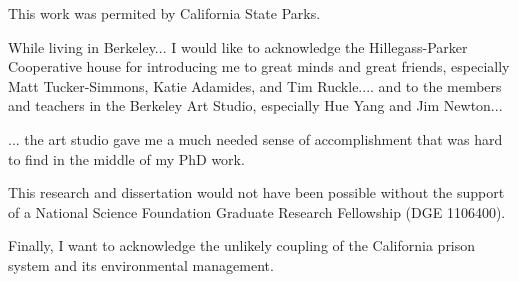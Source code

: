 This work was permited by California State Parks.

While living in Berkeley... 
I would like to acknowledge the Hillegass-Parker Cooperative house for introducing me to great minds and great friends, especially Matt Tucker-Simmons, Katie Adamides, and Tim Ruckle.... and to the members and teachers in the Berkeley Art Studio, especially Hue Yang and Jim Newton...

... the art studio gave me a much needed sense of accomplishment that was hard to find in the middle of my PhD work. 

This research and dissertation would not have been possible without the support of a National Science Foundation Graduate Research Fellowship (DGE 1106400).

Finally, I want to acknowledge the unlikely coupling of the California prison system and its environmental management.